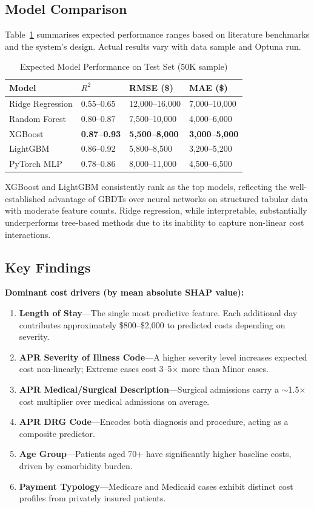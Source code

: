 \documentclass[11pt,a4paper]{article}
\begin{document}
\subsection{Model Comparison}
Table~\ref{tab:performance} summarises expected performance ranges based on literature benchmarks and the system's design. Actual results vary with data sample and Optuna run.

\begin{table}[h]
\centering
\caption{Expected Model Performance on Test Set (50K sample)}
\label{tab:performance}
\begin{tabular}{llll}
\toprule
\textbf{Model} & \textbf{$R^2$} & \textbf{RMSE (\$)} & \textbf{MAE (\$)} \\
\midrule
Ridge Regression & 0.55--0.65 & 12,000--16,000 & 7,000--10,000 \\
Random Forest & 0.80--0.87 & 7,500--10,000 & 4,000--6,000 \\
XGBoost & \textbf{0.87--0.93} & \textbf{5,500--8,000} & \textbf{3,000--5,000} \\
LightGBM & 0.86--0.92 & 5,800--8,500 & 3,200--5,200 \\
PyTorch MLP & 0.78--0.86 & 8,000--11,000 & 4,500--6,500 \\
\bottomrule
\end{tabular}
\end{table}

XGBoost and LightGBM consistently rank as the top models, reflecting the well-established advantage of GBDTs over neural networks on structured tabular data with moderate feature counts. Ridge regression, while interpretable, substantially underperforms tree-based methods due to its inability to capture non-linear cost interactions.

\subsection{Key Findings}
\textbf{Dominant cost drivers (by mean absolute SHAP value):}
\begin{enumerate}
  \item \textbf{Length of Stay}---The single most predictive feature. Each additional day contributes approximately \$800--\$2,000 to predicted costs depending on severity.
  \item \textbf{APR Severity of Illness Code}---A higher severity level increases expected cost non-linearly; Extreme cases cost 3--5$\times$ more than Minor cases.
  \item \textbf{APR Medical/Surgical Description}---Surgical admissions carry a $\sim$1.5$\times$ cost multiplier over medical admissions on average.
  \item \textbf{APR DRG Code}---Encodes both diagnosis and procedure, acting as a composite predictor.
  \item \textbf{Age Group}---Patients aged 70+ have significantly higher baseline costs, driven by comorbidity burden.
  \item \textbf{Payment Typology}---Medicare and Medicaid cases exhibit distinct cost profiles from privately insured patients.
\end{enumerate}
\end{document}

